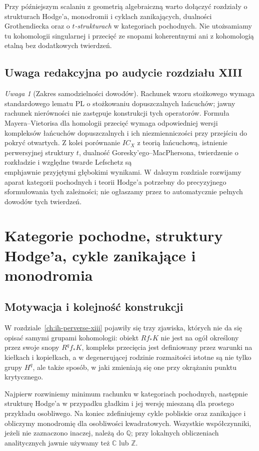 \documentclass[11pt,a4paper,oneside]{report}
\newcommand{\C}{\mathbb{C}}
\newcommand{\Z}{\mathbb{Z}}
\newcommand{\Q}{\mathbb{Q}}
\theoremstyle{plain}
\theoremstyle{definition}
\theoremstyle{remark}
\newtheorem{uwaga}[twierdzenie]{Uwaga}
\begin{document}
Przy późniejszym scalaniu z geometrią algebraiczną
warto dołączyć rozdziały o strukturach Hodge'a,
monodromii i cyklach zanikających, dualności
Grothendiecka oraz o \emph{$t$-strukturach} w kategoriach
pochodnych. Nie utożsamiamy tu kohomologii
singularnej i przecięć ze snopami koherentnymi
ani z kohomologią etalną bez dodatkowych twierdzeń.



\section{Uwaga redakcyjna po audycie rozdziału XIII}
\label{sec:xiii-status-po-audycie}
\begin{uwaga}[Zakres samodzielności dowodów]
Rachunek wzoru stożkowego wymaga standardowego lematu
PL o stożkowaniu dopuszczalnych łańcuchów; jawny
rachunek nierówności nie zastępuje konstrukcji
tych operatorów. Formuła Mayera--Vietorisa dla
homologii przecięć wymaga odpowiedniej wersji
kompleksów łańcuchów dopuszczalnych i ich
niezmienniczości przy przejściu do pokryć otwartych.
Z kolei porównanie $IC_X$ z teorią łańcuchową,
istnienie perwersyjnej struktury $t$, dualność
Goresky'ego--MacPhersona, twierdzenie o rozkładzie
i względne twarde Lefschetz są \\emph{jawnie
przyjętymi} głębokimi wynikami. W dalszym
rozdziale rozwijamy aparat kategorii pochodnych
i teorii Hodge'a potrzebny do precyzyjnego
sformułowania tych zależności; nie ogłaszamy
przez to automatycznie pełnych dowodów tych twierdzeń.
\end{uwaga}
\chapter{Kategorie pochodne, struktury Hodge'a, cykle zanikające i monodromia}
\label{ch:xiv-hodge-monodromia}

\section{Motywacja i kolejność konstrukcji}
W rozdziale~\ref{ch:ih-perverse-xiii} pojawiły się trzy zjawiska,
których nie da się opisać samymi grupami kohomologii:
obiekt $Rf_*K$ nie jest na ogół określony przez swoje snopy
$R^qf_*K$, kompleks przecięcia jest definiowany przez
warunki na kiełkach i kopiełkach, a w degenerującej rodzinie
rozmaitości istotne są nie tylko grupy $H^q$, ale także sposób,
w jaki zmieniają się one przy okrążaniu punktu krytycznego.

Najpierw rozwiniemy minimum rachunku w kategoriach pochodnych,
następnie strukturę Hodge'a w przypadku gładkim i jej wersję
mieszaną dla prostego przykładu osobliwego. Na koniec
zdefiniujemy cykle pobliskie oraz zanikające i obliczymy
monodromię dla osobliwości kwadratowych.
Wszystkie współczynniki, jeżeli nie zaznaczono inaczej, należą
do $\Q$; przy lokalnych obliczeniach analitycznych jawnie
używamy też $\C$ lub $\Z$.
\end{document}
